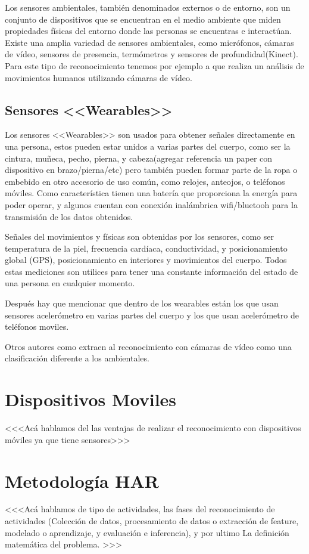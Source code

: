Los sensores ambientales, también denominados externos o de entorno, son un conjunto de dispositivos que se encuentran en el medio ambiente que miden propiedades físicas del entorno donde las personas se encuentras e interactúan. Existe una amplia variedad de sensores ambientales, como micrófonos, cámaras de vídeo, sensores de presencia, termómetros y sensores de profundidad(Kinect). Para este tipo de reconocimiento tenemos por ejemplo a \cite{Poppe2007} que realiza un análisis de movimientos humanos utilizando cámaras de vídeo.

\subsection{Sensores <<Wearables>>}

Los sensores <<Wearables>> son usados para obtener señales directamente en una persona, estos pueden estar unidos a varias partes del cuerpo, como ser la cintura, muñeca, pecho, pierna, y cabeza(agregar referencia un paper con dispositivo en brazo/pierna/etc) pero también pueden formar parte de la ropa o embebido en otro accesorio de uso común, como relojes, anteojos, o teléfonos móviles. Como característica tienen una batería que proporciona la energía para poder operar, y algunos cuentan con conexión inalámbrica wifi/bluetooh para la transmisión de los datos obtenidos.

Señales del movimientos y físicas son obtenidas por los sensores, como ser temperatura de la piel, frecuencia cardíaca, conductividad, y posicionamiento global (GPS), posicionamiento en interiores y movimientos del cuerpo. Todos estas mediciones son utilices para tener una constante información del estado de una persona en cualquier momento.

Después hay que mencionar que dentro de los wearables están los que usan sensores acelerómetro en varias partes del cuerpo y los que usan acelerómetro de teléfonos moviles.

Otros autores como \cite{karmul2010} extraen al reconocimiento con cámaras de vídeo como una clasificación diferente a los ambientales. 


\section{Dispositivos Moviles}
<<<Acá hablamos del las ventajas de realizar el reconocimiento con dispositivos móviles ya que tiene sensores>>>


\section{Metodología HAR}
<<<Acá hablamos de tipo de actividades, las fases del reconocimiento de actividades (Colección de datos, procesamiento de datos o extracción de feature, modelado o aprendizaje, y evaluación e inferencia), y por ultimo La definición matemática del problema. >>>


